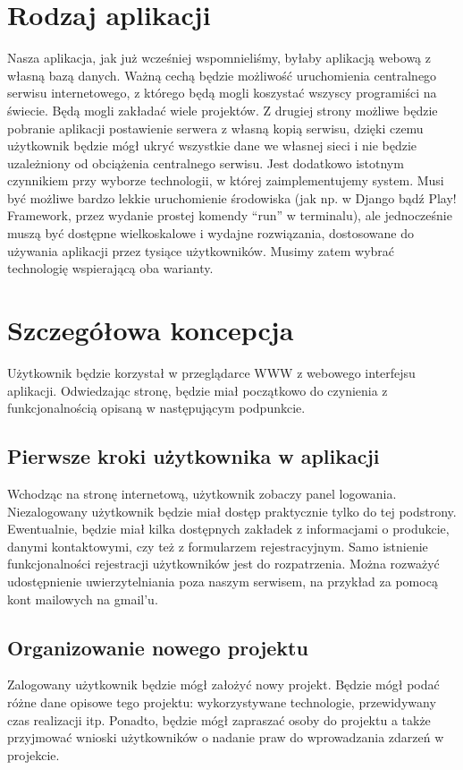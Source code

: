 \documentclass[a4paper,12pt,notitlepage]{mwrep}
\begin{document}
\section{Rodzaj aplikacji}
Nasza aplikacja, jak już wcześniej wspomnieliśmy, byłaby aplikacją webową z własną bazą danych.
Ważną cechą będzie możliwość uruchomienia centralnego serwisu internetowego,
z którego będą mogli koszystać wszyscy programiści na świecie. Będą mogli zakładać wiele projektów.
Z drugiej strony możliwe będzie pobranie aplikacji postawienie serwera z własną kopią serwisu,
dzięki czemu użytkownik będzie mógł ukryć wszystkie dane we własnej sieci i nie będzie
uzależniony od obciążenia centralnego serwisu. Jest dodatkowo istotnym czynnikiem
przy wyborze technologii, w której zaimplementujemy system. Musi być możliwe bardzo
lekkie uruchomienie środowiska (jak np. w Django bądź Play! Framework, przez wydanie
prostej komendy “run” w terminalu), ale jednocześnie muszą być dostępne wielkoskalowe
i wydajne rozwiązania, dostosowane do używania aplikacji przez tysiące użytkowników.
Musimy zatem wybrać technologię wspierającą oba warianty.




\section{Szczegółowa koncepcja}
Użytkownik będzie korzystał w przeglądarce WWW z webowego interfejsu aplikacji.
Odwiedzając stronę, będzie miał początkowo do czynienia z funkcjonalnością opisaną w następującym podpunkcie.

\subsection{Pierwsze kroki użytkownika w aplikacji}
Wchodząc na stronę internetową, użytkownik zobaczy panel logowania.
Niezalogowany użytkownik będzie miał dostęp praktycznie tylko do tej podstrony.
Ewentualnie, będzie miał kilka dostępnych zakładek z informacjami o produkcie,
danymi kontaktowymi, czy też z formularzem rejestracyjnym. Samo istnienie funkcjonalności
rejestracji użytkowników jest do rozpatrzenia. Można rozważyć udostępnienie uwierzytelniania
poza naszym serwisem, na przykład za pomocą kont mailowych na gmail’u.

\subsection{Organizowanie nowego projektu}
Zalogowany użytkownik będzie mógł założyć nowy projekt. Będzie mógł podać
różne dane opisowe tego projektu: wykorzystywane technologie, przewidywany
czas realizacji itp. Ponadto, będzie mógł zapraszać osoby do projektu
a także przyjmować wnioski użytkowników o nadanie praw do wprowadzania zdarzeń w projekcie. 
\end{document}
